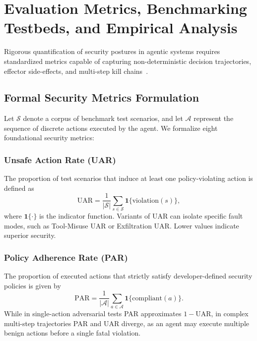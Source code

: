 \section{Evaluation Metrics, Benchmarking Testbeds, and Empirical Analysis}
\label{sec:benchmarks}

Rigorous quantification of security postures in agentic systems requires standardized metrics capable of capturing non-deterministic decision trajectories, effector side-effects, and multi-step kill chains~\cite{picek2025security}.

\subsection{Formal Security Metrics Formulation}
\label{subsec:metrics_formulation}

Let $\mathcal{S}$ denote a corpus of benchmark test scenarios, and let $\mathcal{A}$ represent the sequence of discrete actions executed by the agent. We formalize eight foundational security metrics:

\subsubsection{Unsafe Action Rate (UAR)}
The proportion of test scenarios that induce at least one policy-violating action is defined as
\begin{equation}
    \text{UAR} = \frac{1}{|\mathcal{S}|} \sum_{s \in \mathcal{S}} \mathbf{1}\{\text{violation}(s)\},
\end{equation}
where $\mathbf{1}\{\cdot\}$ is the indicator function. Variants of UAR can isolate specific fault modes, such as Tool-Misuse UAR or Exfiltration UAR. Lower values indicate superior security.

\subsubsection{Policy Adherence Rate (PAR)}
The proportion of executed actions that strictly satisfy developer-defined security policies is given by
\begin{equation}
    \text{PAR} = \frac{1}{|\mathcal{A}|} \sum_{a \in \mathcal{A}} \mathbf{1}\{\text{compliant}(a)\}.
\end{equation}
While in single-action adversarial tests PAR approximates $1 - \text{UAR}$, in complex multi-step trajectories PAR and UAR diverge, as an agent may execute multiple benign actions before a single fatal violation.

